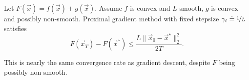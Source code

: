\begin{theorem}
    Let $F(\vec{x}) = f(\vec{x}) + g(\vec{x})$. Assume $f$ is convex and $L$-smooth, $g$ is convex
    and possibly non-smooth. Proximal gradient method with fixed stepsize $\gamma_t \doteq \nicefrac{1}{L}$
    satisfies \[
        F(\vec{x}_T) - F(\vec{x}^\star) \leq \frac{L \| \vec{x}_0 - \vec{x}^\star \|_2^2}{2T}.
    \]
\end{theorem}
This is nearly the same convergence rate as gradient descent, despite $F$ being possibly non-smooth.
